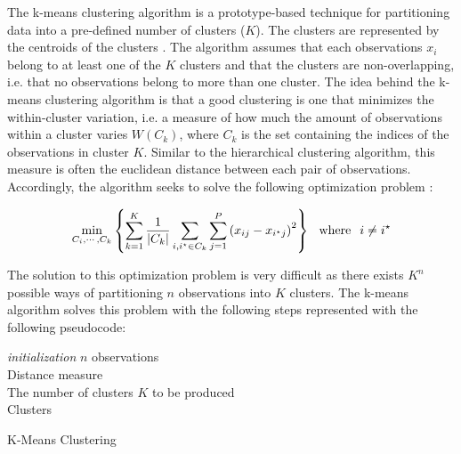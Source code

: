 \documentclass[../thesis.tex]{subfiles}
\begin{document}
\noindent The k-means clustering algorithm \citep{forgy1965cluster} is a prototype-based technique for partitioning data into a pre-defined number of clusters ($K$). The clusters are represented by the centroids of the clusters \citep{tan2007introduction}. The algorithm assumes that each observations $x_i$ belong to at least one of the $K$ clusters and that the clusters are non-overlapping, i.e. that no observations belong to more than one cluster. The idea behind the k-means clustering algorithm is that a good clustering is one that minimizes the within-cluster variation, i.e. a measure of how much the amount of observations within a cluster varies $W(C_k)$, where $C_k$ is the set containing the indices of the observations in cluster $K$. Similar to the hierarchical clustering algorithm, this measure is often the euclidean distance between each pair of observations. Accordingly, the algorithm seeks to solve the following optimization problem \citep{james2013introduction}:

\begin{align}
    \min_{C_i, \cdots, C_k} \left\{\sum_{k=1}^K \frac{1}{|C_k|} \sum_{i,i^\star \in C_k}\sum_{j=1}^P\left(x_{ij} - x_{i^\star j} \right)^2 \right\}\hspace*{0,25cm}\text{where}\hspace*{0,25cm} i \neq i^\star
\end{align}

\noindent The solution to this optimization problem is very difficult as there exists $K^n$ possible ways of partitioning $n$ observations into $K$ clusters. The k-means algorithm solves this problem with the following steps represented with the following pseudocode:\\

\begin{algorithm}[H]{
\SetAlgoLined
\textit{initialization}\;
    \hspace*{0,5cm}$n$ observations\\
    \hspace*{0,5cm}Distance measure\\
    \hspace*{0,5cm}The number of clusters $K$ to be produced\\
    \Return Clusters
}
\caption{K-Means Clustering}
\end{algorithm}\vspace*{0,5cm}
\end{document}
